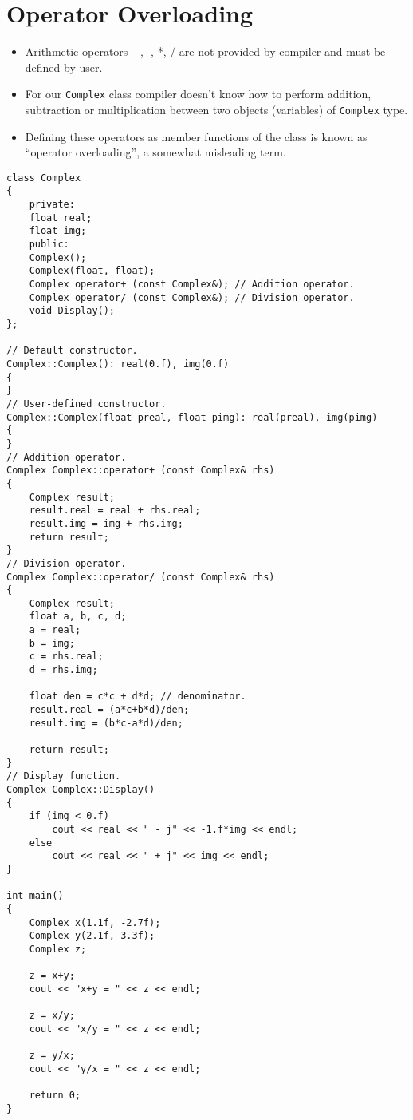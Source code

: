\documentclass[12pt,a4paper]{article}
\begin{document}
\section{Operator Overloading}
\begin{itemize}
\item Arithmetic operators +, -, *, / are not provided by compiler and must be defined by user.
\item For our \verb|Complex| class compiler doesn't know how to perform addition, subtraction or multiplication between two objects (variables) of \verb|Complex| type.
\item Defining these operators as member functions of the class is known as ``operator overloading'', a somewhat misleading term.
\end{itemize}
\begin{lstlisting}[caption={Overloading Arithmetic Operators}]
class Complex
{
	private:
	float real;
	float img;
	public:
	Complex();
	Complex(float, float);
	Complex operator+ (const Complex&); // Addition operator.
	Complex operator/ (const Complex&); // Division operator.
	void Display();
};

// Default constructor.
Complex::Complex(): real(0.f), img(0.f)
{
}
// User-defined constructor.
Complex::Complex(float preal, float pimg): real(preal), img(pimg)
{
}
// Addition operator.
Complex Complex::operator+ (const Complex& rhs)
{
	Complex result;
	result.real = real + rhs.real;
	result.img = img + rhs.img;
	return result;
}
// Division operator.
Complex Complex::operator/ (const Complex& rhs)
{
	Complex result;
	float a, b, c, d;
	a = real;
	b = img;
	c = rhs.real;
	d = rhs.img;

	float den = c*c + d*d; // denominator.
	result.real = (a*c+b*d)/den;
	result.img = (b*c-a*d)/den;

	return result;
}
// Display function.
Complex Complex::Display()
{
	if (img < 0.f)
		cout << real << " - j" << -1.f*img << endl;
	else
		cout << real << " + j" << img << endl;
}

int main()
{
	Complex x(1.1f, -2.7f);
	Complex y(2.1f, 3.3f);
	Complex z;

	z = x+y;
	cout << "x+y = " << z << endl;

	z = x/y;
	cout << "x/y = " << z << endl;

	z = y/x;
	cout << "y/x = " << z << endl;

	return 0;
}
\end{lstlisting}


\end{document}
